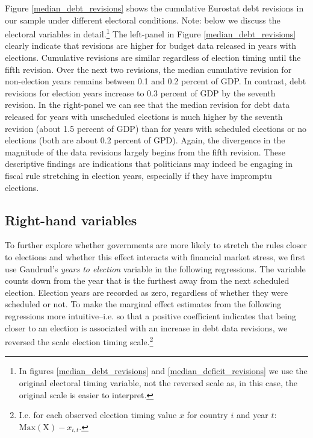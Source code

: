 \documentclass[]{article}
\begin{document}
Figure \ref{median_debt_revisions} shows the cumulative Eurostat debt revisions in our sample under different electoral conditions. Note: below we discuss the electoral variables in detail.\footnote{In figures \ref{median_debt_revisions} and \ref{median_deficit_revisions} we use the original electoral timing variable, not the reversed scale as, in this case, the original scale is easier to interpret.} The left-panel in Figure \ref{median_debt_revisions} clearly indicate that revisions are higher for budget data released in years with elections. Cumulative revisions are similar regardless of election timing until the fifth revision. Over the next two revisions, the median cumulative revision for non-election years remains between 0.1 and 0.2 percent of GDP. In contrast, debt revisions for election years increase to 0.3 percent of GDP by the seventh revision. In the right-panel we can see that the median revision for debt data released for years with unscheduled elections is much higher by the seventh revision (about 1.5 percent of GDP) than for years with scheduled elections or no elections (both are about 0.2 percent of GPD). Again, the divergence in the magnitude of the data revisions largely begins from the fifth revision. These descriptive findings are indications that politicians may indeed be engaging in fiscal rule stretching in election years, especially if they have impromptu elections.

\subsection{Right-hand variables}

To further explore whether governments are more likely to stretch the rules closer to elections and whether this effect interacts with financial market stress, we first use Gandrud's \citeyearpar{gandrudYrcurnt} \emph{years to election} variable in the following regressions. The variable counts down from the year that is the furthest away from the next scheduled election. Election years are recorded as zero, regardless of whether they were scheduled or not. To make the marginal effect estimates from the following regressions more intuitive--i.e. so that a positive coefficient indicates that being closer to an election is associated with an increase in debt data revisions, we reversed the scale election timing scale.\footnote{I.e. for each observed election timing value $x$ for country $i$ and year $t$: $\mathrm{Max}(\mathrm{X}) - x_{i,t}$.}
\end{document}
